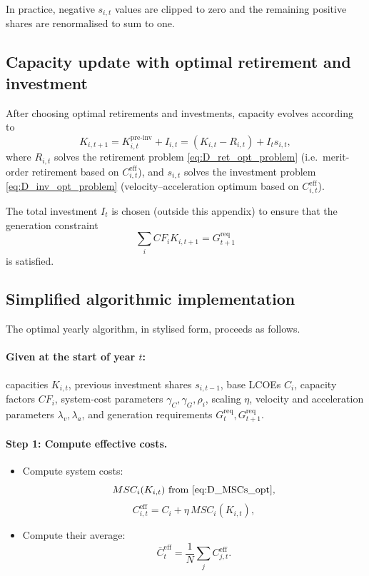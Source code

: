 \documentclass[preprint,authoryear,12pt]{elsarticle}
\begin{document}
In practice, negative $s_{i,t}$ values are clipped to zero and the remaining positive shares are
renormalised to sum to one.

\subsection{Capacity update with optimal retirement and investment}

After choosing optimal retirements and investments, capacity evolves according to
\begin{equation}
    K_{i,t+1}
    = K_{i,t}^{\mathrm{pre\text{-}inv}} + I_{i,t}
    = (K_{i,t} - R_{i,t}) + I_t s_{i,t},
    \label{eq:D_K_update_opt}
\end{equation}
where $R_{i,t}$ solves the retirement problem \eqref{eq:D_ret_opt_problem} (i.e.\ merit-order
retirement based on $C_{i,t}^{\mathrm{eff}}$), and $s_{i,t}$ solves the investment problem
\eqref{eq:D_inv_opt_problem} (velocity–acceleration optimum based on $C_{i,t}^{\mathrm{eff}}$).

The total investment $I_t$ is chosen (outside this appendix) to ensure that the generation
constraint
\[
    \sum_i CF_i K_{i,t+1} = G_{t+1}^{\mathrm{req}}
\]
is satisfied.

\subsection{Simplified algorithmic implementation}

The optimal yearly algorithm, in stylised form, proceeds as follows.

\paragraph{Given at the start of year $t$:}
capacities $K_{i,t}$, previous investment shares $s_{i,t-1}$,
base LCOEs $C_i$, capacity factors $CF_i$,
system-cost parameters $\gamma_C, \gamma_G, \rho_i$, scaling $\eta$,
velocity and acceleration parameters $\lambda_v, \lambda_a$,
and generation requirements $G_t^{\mathrm{req}}, G_{t+1}^{\mathrm{req}}$.

\medskip

\noindent
\paragraph{Step 1: Compute effective costs.}
\begin{itemize}
    \item Compute system costs:
    \[
        MSC_i(K_{i,t}) \text{ from \eqref{eq:D_MSCs_opt}},
    \]
    \[
        C_{i,t}^{\mathrm{eff}} = C_i + \eta\, MSC_i(K_{i,t}),
    \]
    \item Compute their average:
    \[
        \bar{C}_t^{\mathrm{eff}} = \frac{1}{N} \sum_j C_{j,t}^{\mathrm{eff}}.
    \]
\end{itemize}
\end{document}

